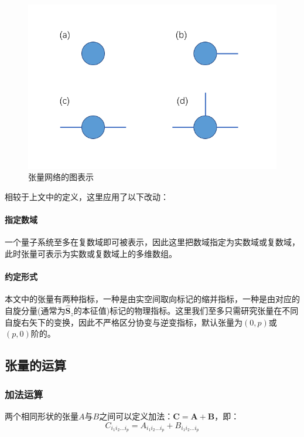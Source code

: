 \begin{figure}[htb]
	\centering
	\includegraphics[width=1\textwidth]{image/Tensor.png}
	\caption{张量网络的图表示}
	\label{fig:sgd-svrg2}
\end{figure}

相较于上文中的定义，这里应用了以下改动：
\paragraph{指定数域}
一个量子系统至多在复数域即可被表示，因此这里把数域指定为实数域或复数域，此时张量可表示为实数或复数域上的多维数组。
\paragraph{约定形式}
本文中的张量有两种指标，一种是由实空间取向标记的缩并指标，一种是由对应的自旋分量(通常为$\hat{\symbf{S}}_z$的本征值)标记的物理指标。这里我们至多只需研究张量在不同自旋右矢下的变换，因此不严格区分协变与逆变指标，默认张量为$(0,p)$或$(p,0)$阶的。



\subsection{张量的运算}

\subsubsection{加法运算}

两个相同形状的张量$A$与$B$之间可以定义加法：$\symbf{C} = \symbf{A}+\symbf{B}$，即：
\begin{equation}
C_{i_1 i_2 \dots i_p} = A_{i_1 i_2 \dots i_p} + B_{i_1 i_2 \dots i_p}
\end{equation}


